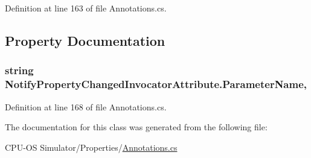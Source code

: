 Definition at line 163 of file Annotations.\+cs.



\subsection{Property Documentation}
\hypertarget{class_notify_property_changed_invocator_attribute_a156a54b467974741191e07b4812442ac}{}
\subsubsection[{Parameter\+Name}]{\setlength{\rightskip}{0pt plus 5cm}string Notify\+Property\+Changed\+Invocator\+Attribute.\+Parameter\+Name\hspace{0.3cm}{\ttfamily [get]}, {}}\label{class_notify_property_changed_invocator_attribute_a156a54b467974741191e07b4812442ac}


Definition at line 168 of file Annotations.\+cs.



The documentation for this class was generated from the following file\+:\begin{DoxyCompactItemize}
\item 
C\+P\+U-\/\+O\+S Simulator/\+Properties/\hyperlink{_annotations_8cs}{Annotations.\+cs}\end{DoxyCompactItemize}
